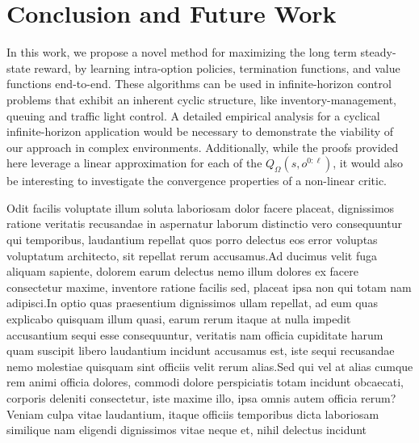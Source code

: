 \documentclass[letterpaper]{article} %
\begin{document}
\section{Conclusion and Future Work}
In this work, we propose a novel method for maximizing the long term steady-state reward, by learning intra-option policies, termination functions, and value functions end-to-end. These algorithms can be used in infinite-horizon control problems that exhibit an inherent cyclic structure, like inventory-management, queuing and traffic light control. A detailed empirical analysis for a cyclical infinite-horizon application would be necessary to demonstrate the viability of our approach in complex environments. Additionally, while the proofs provided here leverage a linear approximation for each of the $Q_\Omega(s,o^{0:\ell})$, it would also be interesting to investigate the convergence properties of a non-linear critic.





Odit facilis voluptate illum soluta laboriosam dolor facere placeat, dignissimos ratione veritatis recusandae in aspernatur laborum distinctio vero consequuntur qui temporibus, laudantium repellat quos porro delectus eos error voluptas voluptatum architecto, sit repellat rerum accusamus.Ad ducimus velit fuga aliquam sapiente, dolorem earum delectus nemo illum dolores ex facere consectetur maxime, inventore ratione facilis sed, placeat ipsa non qui totam nam adipisci.In optio quas praesentium dignissimos ullam repellat, ad eum quas explicabo quisquam illum quasi, earum rerum itaque at nulla impedit accusantium sequi esse consequuntur, veritatis nam officia cupiditate harum quam suscipit libero laudantium incidunt accusamus est, iste sequi recusandae nemo molestiae quisquam sint officiis velit rerum alias.Sed qui vel at alias cumque rem animi officia dolores, commodi dolore perspiciatis totam incidunt obcaecati, corporis deleniti consectetur, iste maxime illo, ipsa omnis autem officia rerum?Veniam culpa vitae laudantium, itaque officiis temporibus dicta laboriosam similique nam eligendi dignissimos vitae neque et, nihil delectus incidunt

\end{document}
